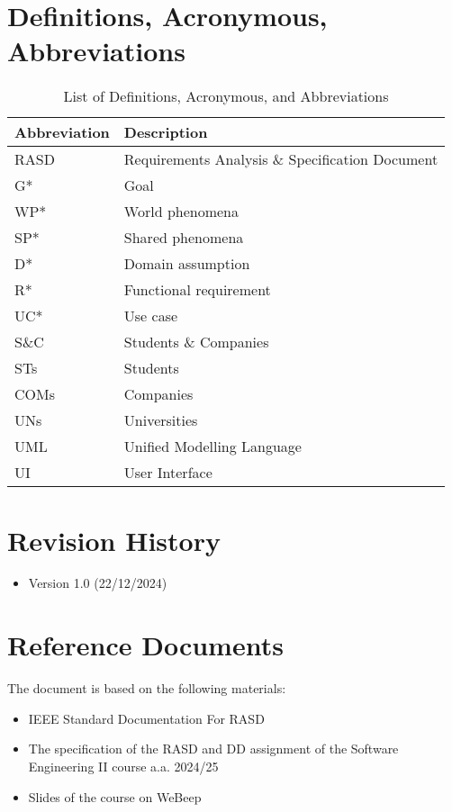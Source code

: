 \section{Definitions, Acronymous, Abbreviations}
\begin{table}[H]
\centering
\begin{tabular}{|l|l|}
\hline
\textbf{Abbreviation} & \textbf{Description} \\ \hline
RASD & Requirements Analysis \& Specification Document \\ \hline
G* & Goal \\ \hline
WP* & World phenomena \\ \hline
SP* & Shared phenomena \\ \hline
D* & Domain assumption \\ \hline
R* & Functional requirement \\ \hline
UC* & Use case \\ \hline
S\&C & Students \& Companies \\ \hline
STs & Students \\ \hline
COMs & Companies \\ \hline
UNs & Universities \\ \hline
UML & Unified Modelling Language \\ \hline
UI & User Interface \\ \hline
\end{tabular}
\caption{List of Definitions, Acronymous, and Abbreviations}
\label{table:abbreviations}
\end{table}

  
\section{Revision History}

\begin{itemize}
    \item Version 1.0 (22/12/2024)
\end{itemize}

\section{Reference Documents}

The document is based on the following materials:

\begin{itemize}
    \item IEEE Standard Documentation For RASD
    \item The specification of the RASD and DD assignment of the Software Engineering II course a.a. 2024/25 
    \item Slides of the course on WeBeep
\end{itemize}

